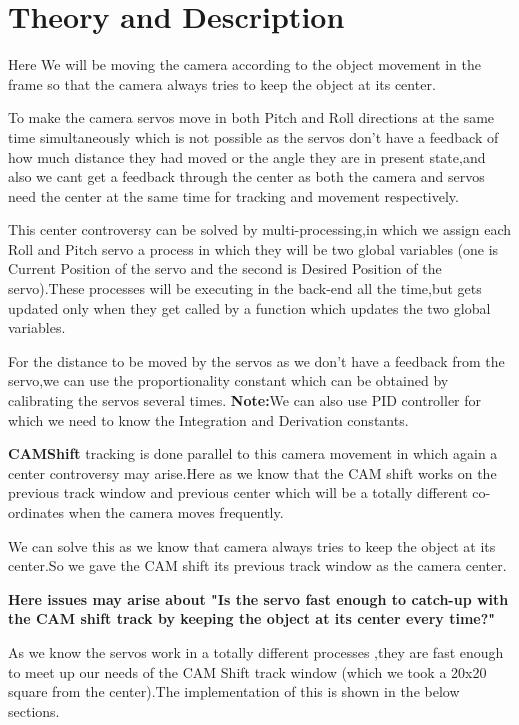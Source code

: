 \documentclass[11pt,a4paper]{article}
\begin{document}
	\section{Theory and Description}
	Here We will be moving the camera according to the object movement in the frame so that the camera always tries to keep the object at its center.
	\par To make the camera servos move in both Pitch and Roll directions at the same time simultaneously which is not possible as the servos don't have a feedback of how much distance they had moved or the angle they are in present state,and also we cant get a feedback through the center as both the camera and servos need the center at the same time for tracking and movement respectively.
	\par This center controversy can be solved by multi-processing,in which we assign each Roll and Pitch servo a process in which they will be two global variables (one is Current Position of the servo and the second is Desired Position of the servo).These processes will be executing in the back-end all the time,but gets updated only when they get called by a function which updates the two global variables.   
	\par For the distance to be moved by the servos as we don't have a feedback from the servo,we can use the proportionality constant which can be obtained by calibrating the servos several times.
	\newline
	\textbf{Note:}We can also use PID controller for which we need to know the Integration and Derivation constants. 
	 \vspace{1cm}
	 \par\textbf{CAMShift} tracking is done parallel to this camera movement in which again a center controversy may arise.Here as we know that the CAM shift works on the previous track window and previous center which will be a totally different co-ordinates when the camera moves frequently.
	 \par We can solve this as we know that camera always tries to keep the object at its center.So we gave the CAM shift its previous track window as the camera center.
	 \par \textbf{Here issues may arise about "Is the servo fast enough to catch-up with the CAM shift track by keeping the object at its center every time?"}
	 \par  As we know the servos work in a totally different processes ,they are fast enough to meet up our needs of the CAM Shift track window (which we took a 20x20 square from the center).The implementation of this is shown in the below sections.
	
\end{document}
